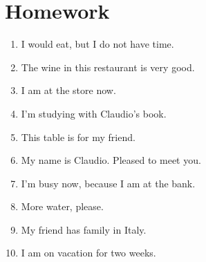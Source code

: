 \section{Homework} \label{0228-Homework}
\begin{enumerate}
    \item I would eat, but I do not have time. \\
    \item The wine in this restaurant is very good. \\
    \item I am at the store now. \\
    \item I'm studying with Claudio's book. \\
    \item This table is for my friend. \\
    \item My name is Claudio. Pleased to meet you. \\
    \item I'm busy now, because I am at the bank. \\
    \item More water, please. \\
    \item My friend has family in Italy. \\
    \item I am on vacation for two weeks. \\
\end{enumerate}
